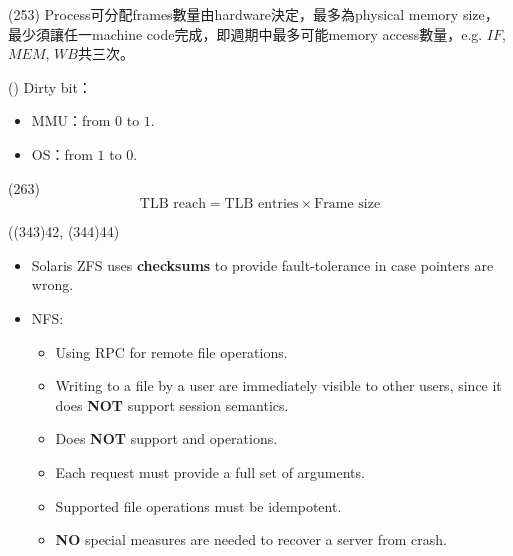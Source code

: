 \begin{theorem}{(253)} Process可分配frames數量由hardware決定，最多為physical memory size，最少須讓任一machine code完成，即週期中最多可能memory access數量，e.g. $IF$, $MEM$, $WB$共三次。
\end{theorem}

\begin{theorem}{()} Dirty bit：\begin{itemize}
        \item MMU：from $0$ to $1$.
        \item OS：from $1$ to $0$.
    \end{itemize}
\end{theorem}

\begin{theorem}{(263)} \quad\quad \begin{equation}
        \text{TLB reach} = \text{TLB entries} \times \text{Frame size}
    \end{equation}
\end{theorem}

\begin{theorem}{((343)42, (344)44)} \quad\quad \begin{itemize}
        \item Solaris ZFS uses \textbf{checksums} to provide fault-tolerance in case pointers are wrong.
        \item NFS: \begin{itemize}
            \item Using RPC for remote file operations.
            \item Writing to a file by a user are immediately visible to other users, since it does \textbf{NOT} support session semantics.
            \item Does \textbf{NOT} support  and  operations.
            \item Each request must provide a full set of arguments.
            \item Supported file operations must be idempotent.
            \item \textbf{NO} special measures are needed to recover a server from crash.
        \end{itemize}
    \end{itemize}
\end{theorem}

